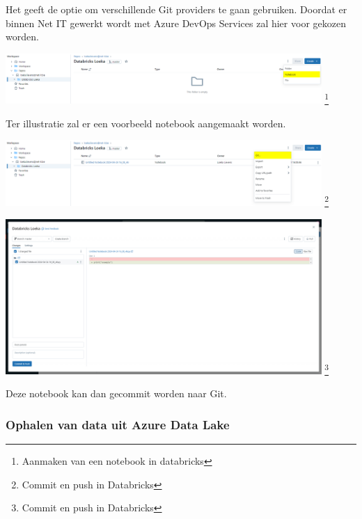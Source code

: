 Het geeft de optie om verschillende Git providers te gaan gebruiken. Doordat er binnen Net IT gewerkt wordt met Azure DevOps Services zal hier voor gekozen worden.

\begin{center}
    \includegraphics[width=0.9\textwidth]{./graphics/databricks/git_2.png}
    \footnote{Aanmaken van een notebook in databricks}
\end{center}

Ter illustratie zal er een voorbeeld notebook aangemaakt worden.

\begin{center}
    \includegraphics[width=0.9\textwidth]{./graphics/databricks/git_3.png}
    \footnote{Commit en push in Databricks}
\end{center}

\begin{center}
    \includegraphics[width=0.9\textwidth]{./graphics/databricks/git_4.png}
    \footnote{Commit en push in Databricks}
\end{center}

Deze notebook kan dan gecommit worden naar Git.

\subsubsection{Ophalen van data uit Azure Data Lake}

